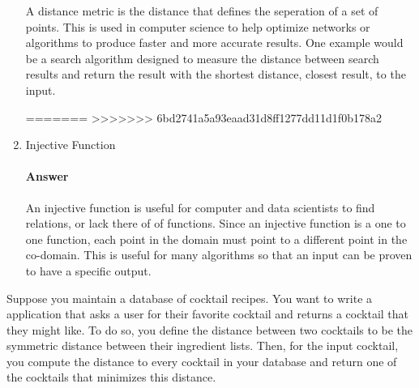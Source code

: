 \documentclass{article}
\begin{document}
\begin{enumerate}
        A distance metric is the distance that defines the seperation of a set of points. This is used in computer science to help optimize networks or algorithms to produce faster and more accurate results. One example would be a search algorithm designed to measure the distance between search results and return the result with the shortest distance, closest result, to the input.

=======
>>>>>>> 6bd2741a5a93eaad31d8ff1277dd11d1f0b178a2
    \item Injective Function

        \paragraph{Answer}

        An injective function is useful for computer and data scientists to find relations, or lack there of of functions. Since an injective function is a one to one function, each point in the domain must point to a different point in the co-domain. This is useful for many algorithms so that an input can be proven to have a specific output.


\end{enumerate}


 

Suppose you maintain a database of cocktail recipes.  You want to write a
application that asks a user for their favorite cocktail and returns a cocktail
that they might like.  To do so, you define the distance between two cocktails
to be the symmetric distance between their ingredient lists.  Then, for the
input cocktail, you compute the distance to every cocktail in your database and
return one of the cocktails that minimizes this distance.
\end{document}
